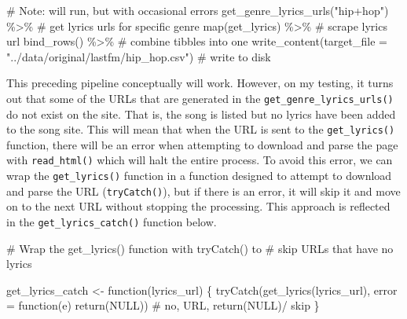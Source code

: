 \documentclass[
  letterpaper,
]{latex/krantz}
\newenvironment{Shaded}{\begin{snugshade}}{\end{snugshade}}
\newcommand{\AttributeTok}[1]{\textcolor[rgb]{0.40,0.45,0.13}{#1}}
\newcommand{\CommentTok}[1]{\textcolor[rgb]{0.37,0.37,0.37}{#1}}
\newcommand{\ConstantTok}[1]{\textcolor[rgb]{0.56,0.35,0.01}{#1}}
\newcommand{\ControlFlowTok}[1]{\textcolor[rgb]{0.00,0.23,0.31}{#1}}
\newcommand{\FunctionTok}[1]{\textcolor[rgb]{0.28,0.35,0.67}{#1}}
\newcommand{\NormalTok}[1]{\textcolor[rgb]{0.00,0.23,0.31}{#1}}
\newcommand{\OtherTok}[1]{\textcolor[rgb]{0.00,0.23,0.31}{#1}}
\newcommand{\SpecialCharTok}[1]{\textcolor[rgb]{0.37,0.37,0.37}{#1}}
\newcommand{\StringTok}[1]{\textcolor[rgb]{0.13,0.47,0.30}{#1}}
\begin{document}
\begin{Shaded}
\begin{Highlighting}[]
\CommentTok{\# Note: will run, but with occasional errors}
\FunctionTok{get\_genre\_lyrics\_urls}\NormalTok{(}\StringTok{"hip+hop"}\NormalTok{) }\SpecialCharTok{\%\textgreater{}\%} \CommentTok{\# get lyrics urls for specific genre}
  \FunctionTok{map}\NormalTok{(get\_lyrics) }\SpecialCharTok{\%\textgreater{}\%}  \CommentTok{\# scrape lyrics url}
  \FunctionTok{bind\_rows}\NormalTok{() }\SpecialCharTok{\%\textgreater{}\%} \CommentTok{\# combine tibbles into one}
  \FunctionTok{write\_content}\NormalTok{(}\AttributeTok{target\_file =} \StringTok{"../data/original/lastfm/hip\_hop.csv"}\NormalTok{) }\CommentTok{\# write to disk}
\end{Highlighting}
\end{Shaded}

This preceding pipeline conceptually will work. However, on my testing,
it turns out that some of the URLs that are generated in the
\texttt{get\_genre\_lyrics\_urls()} do not exist on the site. That is,
the song is listed but no lyrics have been added to the song site. This
will mean that when the URL is sent to the \texttt{get\_lyrics()}
function, there will be an error when attempting to download and parse
the page with \texttt{read\_html()} which will halt the entire process.
To avoid this error, we can wrap the \texttt{get\_lyrics()} function in
a function designed to attempt to download and parse the URL
(\texttt{tryCatch()}), but if there is an error, it will skip it and
move on to the next URL without stopping the processing. This approach
is reflected in the \texttt{get\_lyrics\_catch()} function below.

\begin{Shaded}
\begin{Highlighting}[]
\CommentTok{\# Wrap the \textasciigrave{}get\_lyrics()\textasciigrave{} function with \textasciigrave{}tryCatch()\textasciigrave{} to }
\CommentTok{\# skip URLs that have no lyrics}

\NormalTok{get\_lyrics\_catch }\OtherTok{\textless{}{-}} \ControlFlowTok{function}\NormalTok{(lyrics\_url) \{}
  \FunctionTok{tryCatch}\NormalTok{(}\FunctionTok{get\_lyrics}\NormalTok{(lyrics\_url), }
           \AttributeTok{error =} \ControlFlowTok{function}\NormalTok{(e) }\FunctionTok{return}\NormalTok{(}\ConstantTok{NULL}\NormalTok{)) }\CommentTok{\# no, URL, return(NULL)/ skip}
\NormalTok{\}}
\end{Highlighting}
\end{Shaded}
\end{document}
